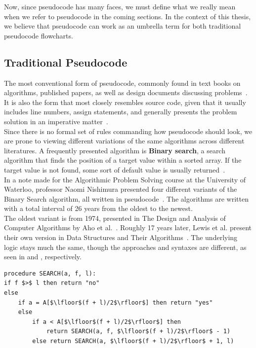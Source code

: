 Now, since pseudocode has many faces, we must define what we really mean when we refer to pseudocode in the coming sections. In the context of this thesis, we believe that pseudocode can work as an umbrella term for both traditional pseudocode flowcharts.

\subsection{Traditional Pseudocode}

The most conventional form of pseudocode, commonly found in text books on algorithms, published papers, as well as design documents discussing problems~\cite{pseudocodeInBook1, pseudocodeInBook2, pseudocodeInPaper1, pseudocodeInPaper2}. It is also the form that most closely resembles source code, given that it usually includes line numbers, assign statements, and generally presents the problem solution in an imperative matter~\cite[247]{pseudocodeTendsToBeImperative}. \\

Since there is no formal set of rules commanding how pseudocode should look, we are prone to viewing different variations of the same algorithms across different literatures. A frequently presented algorithm is \textbf{Binary search}, a search algorithm that finds the position of a target value within a sorted array. If the target value is not found, some sort of default value is usually returned~\cite{pseudocodeInBook1}. \\

In a note made for the Algorithmic Problem Solving course at the University of Waterloo, professor Naomi Nishimura presented four different variants of the Binary Search algorithm, all written in pseudocode~\cite{differentVersionsOfBinarySearch}. The algorithms are written with a total interval of 26 years from the oldest to the newest. \\

The oldest variant is from 1974, presented in The Design and Analysis of Computer Algorithms by Aho et al.~\cite[139]{binarySearchSource1}. Roughly 17 years later, Lewis et al. present their own version in Data Structures and Their Algorithms~\cite[182]{binarySearchSource2}. The underlying logic stays much the same, though the approaches and syntaxes are different, as seen in  and , respectively. \\

\begin{lstlisting}[caption={Binary Search by Aho et al.}, captionpos=b, label={Binary Search by Aho et al.}]
procedure SEARCH(a, f, l):
if f $>$ l then return "no"
else
    if a = A[$\lfloor$(f + l)/2$\rfloor$] then return "yes"
    else
        if a < A[$\lfloor$(f + l)/2$\rfloor$] then
            return SEARCH(a, f, $\lfloor$(f + l)/2$\rfloor$ - 1)
        else return SEARCH(a, $\lfloor$(f + l)/2$\rfloor$ + 1, l)
\end{lstlisting}

